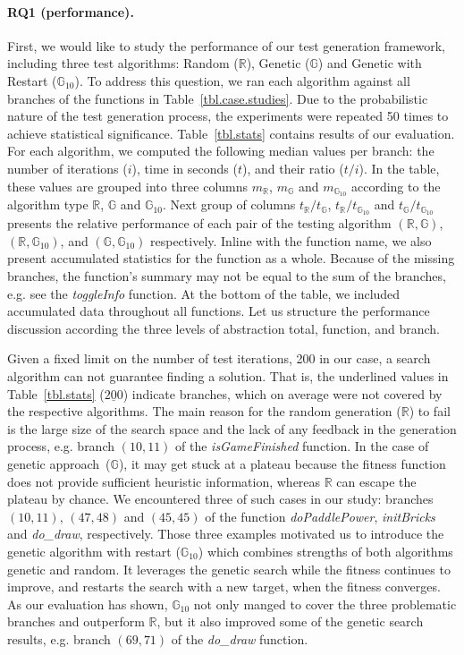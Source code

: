 \documentclass[sigconf,review, anonymous]{acmart}
\newcommand{\Random}{\mathbb{R}}
\newcommand{\Genetic}{\mathbb{G}}
\newcommand{\RGenetic}{\mathbb{G}_{10}}
\begin{document}
\paragraph{\textbf{RQ1 (performance).}} First, we would like to study the performance of our test generation framework, including three test algorithms: Random ($\Random$), Genetic ($\Genetic$) and Genetic with Restart ($\RGenetic$). To address this question, we ran each algorithm against all branches of the functions in Table~\ref{tbl.case.studies}. Due to the probabilistic nature of the test generation process, the experiments were repeated 50 times to achieve statistical significance. 
Table~\ref{tbl.stats} contains results of our evaluation. For each algorithm, we computed the following median values per branch: the number of iterations ($i$), time in seconds ($t$), and their ratio ($t/i$). In the table, these values are grouped into three columns $m_{\Random}$, $m_{\Genetic}$ and $m_{\RGenetic}$ according to the algorithm type $\Random$, $\Genetic$ and $\RGenetic$. Next group of columns $t_{\Random}/t_{\Genetic}$, $t_{\Random}/t_{\RGenetic}$ and $t_{\Genetic}/t_{\RGenetic}$ presents the relative performance of each pair of the testing algorithm $(\Random,\Genetic)$, $(\Random,\RGenetic)$, and $(\Genetic,\RGenetic)$ respectively. Inline with the function name, we also present accumulated statistics for the function as a whole. Because of the missing branches, the function's summary may not be equal to the sum of the branches, e.g. see the \emph{toggleInfo} function. At the bottom of the table, we included accumulated data throughout all functions. Let us structure the performance discussion according the three levels of abstraction total, function, and branch.  

Given a fixed limit on the number of test iterations, 200 in our case, a search algorithm can not guarantee finding a solution. That is, the underlined values in Table~\ref{tbl.stats}  ($\underline{200}$) indicate branches, which on average were not covered by the respective algorithms. The main reason for the random generation ($\Random$) to fail is the large size of the search space and the lack of any feedback in the generation process, e.g. branch $(10,11)$ of the \emph{isGameFinished} function. In the case of genetic approach~($\Genetic$), it may get stuck at a plateau because the fitness function does not provide sufficient heuristic information, whereas $\Random$ can escape the plateau by chance. We encountered three of such cases in our study: branches $(10,11)$, $(47,48)$ and $(45,45)$ of the function \emph{doPaddlePower}, \emph{initBricks} and \emph{do_draw}, respectively. Those three examples motivated us to introduce the genetic algorithm with restart ($\RGenetic$) which combines strengths of both algorithms genetic and random. It leverages the genetic search while the fitness continues to improve, and restarts the search with a new target, when the fitness converges. As our evaluation has shown, $\RGenetic$ not only manged to cover the three problematic branches and outperform $\Random$, but it also improved some of the genetic search results, e.g. branch $(69,71)$ of the \emph{do_draw} function.
\end{document}
